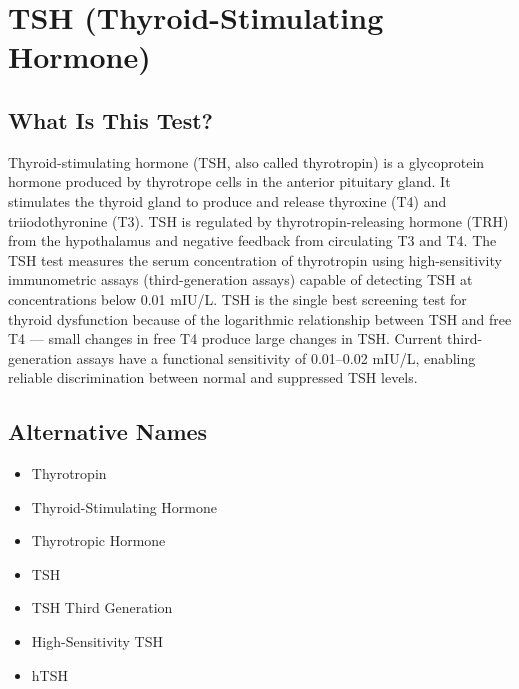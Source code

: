 \chapter{TSH (Thyroid-Stimulating Hormone)}

\section*{What Is This Test?}
Thyroid-stimulating hormone (TSH, also called thyrotropin) is a glycoprotein hormone produced by thyrotrope cells in the anterior pituitary gland. It stimulates the thyroid gland to produce and release thyroxine (T4) and triiodothyronine (T3). TSH is regulated by thyrotropin-releasing hormone (TRH) from the hypothalamus and negative feedback from circulating T3 and T4. The TSH test measures the serum concentration of thyrotropin using high-sensitivity immunometric assays (third-generation assays) capable of detecting TSH at concentrations below 0.01 mIU/L. TSH is the single best screening test for thyroid dysfunction because of the logarithmic relationship between TSH and free T4 --- small changes in free T4 produce large changes in TSH. Current third-generation assays have a functional sensitivity of 0.01--0.02 mIU/L, enabling reliable discrimination between normal and suppressed TSH levels.

\section*{Alternative Names}
\begin{itemize}
  \item Thyrotropin
  \item Thyroid-Stimulating Hormone
  \item Thyrotropic Hormone
  \item TSH
  \item TSH Third Generation
  \item High-Sensitivity TSH
  \item hTSH
\end{itemize}
